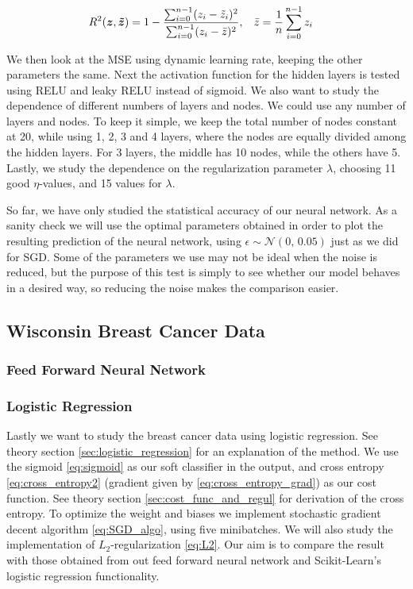 \documentclass[12pt]{extarticle}
\begin{document}
\begin{align} \label{eq:R2_score}
	R^2(\boldsymbol{z}, \boldsymbol{\tilde{z}}) & = 1 - \frac{\sum_{i=0}^{n-1}(z_i - \tilde{z}_i)^2}{\sum_{i=0}^{n-1}(z_i - \bar{z})^2}, \hspace{3mm} \bar{z} = \frac{1}{n}\sum_{i=0}^{n-1}z_i
\end{align}


We then look at the MSE using dynamic learning rate, keeping the other parameters the same. Next the activation function for the hidden layers is tested using RELU and leaky RELU  instead of sigmoid. We also want to study the dependence of different numbers of layers and nodes. We could use any number of layers and nodes. To keep it simple, we keep the total number of nodes constant at 20, while using 1, 2, 3 and 4 layers, where the nodes are equally divided among the hidden layers. For 3 layers, the middle has 10 nodes, while the others have 5. Lastly, we study the dependence on the regularization parameter $\lambda$, choosing 11 good $\eta$-values, and 15 values for $\lambda$.



So far, we have only studied the statistical accuracy of our neural network. As a sanity check we will use the optimal parameters obtained in order to plot the resulting prediction of the neural network, using $\epsilon\sim\mathcal{N}(0,\,0.05)$ just as we did for SGD. Some of the parameters we use may not be ideal when the noise is reduced, but the purpose of this test is simply to see whether our model behaves in a desired way, so reducing the noise makes the comparison easier.



\subsection{Wisconsin Breast Cancer Data}
\subsubsection{Feed Forward Neural Network}
\subsubsection{Logistic Regression}
Lastly we want to study the breast cancer data using logistic regression. See theory section \ref{sec:logistic_regression} for an explanation of the method. We use the sigmoid \eqref{eq:sigmoid} as our soft classifier in the output, and cross entropy \eqref{eq:cross_entropy2} (gradient given by \eqref{eq:cross_entropy_grad}) as our cost function. See theory section \ref{sec:cost_func_and_regul} for derivation of the cross entropy. To optimize the weight and biases we implement stochastic gradient decent algorithm \eqref{eq:SGD_algo}, using five minibatches. We will also study the implementation of $L_2$-regularization \eqref{eq:L2}. Our aim is to compare the result with those obtained from out feed forward neural network and Scikit-Learn's logistic regression functionality.
\end{document}
